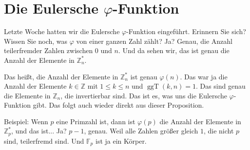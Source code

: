 \begin{ai-global-state-checkpoint-invisible-content}
\end{ai-global-state-checkpoint-invisible-content}

\section{Die Eulersche \texorpdfstring{$\varphi$}{phi}-Funktion}

\begin{spoken-clean}[00:40:18 - 00:42:37]
Letzte Woche hatten wir die Eulersche $\varphi$-Funktion eingeführt. Erinnern Sie sich?  Wissen Sie noch, was $\varphi$ von einer ganzen Zahl zählt? Ja? Genau, die Anzahl teilerfremder Zahlen zwischen $0$ und $n$. Und da sehen wir, das ist genau die Anzahl der Elemente in $\mathbb{Z}_n^*$.

Das heißt, die Anzahl der Elemente in $\mathbb{Z}_n^*$ ist genau $\varphi(n)$. Das war ja die Anzahl der Elemente $k \in \mathbb{Z}$ mit $1 \le k \le n$ und $\operatorname{ggT}(k, n) = 1$. Das sind genau die Elemente in $\mathbb{Z}_n$, die invertierbar sind. Das ist es, was uns die Eulersche $\varphi$-Funktion gibt. Das folgt auch wieder direkt aus dieser Proposition.

Beispiel: Wenn $p$ eine Primzahl ist, dann ist $\varphi(p)$ die Anzahl der Elemente in $\mathbb{Z}_p^*$, und das ist... Ja? $p - 1$, genau. Weil alle Zahlen größer gleich $1$, die nicht $p$ sind, teilerfremd sind. Und $\mathbb{F}_p$ ist ja ein Körper.
\end{spoken-clean}

\begin{math-stroke}


\end{math-stroke}

